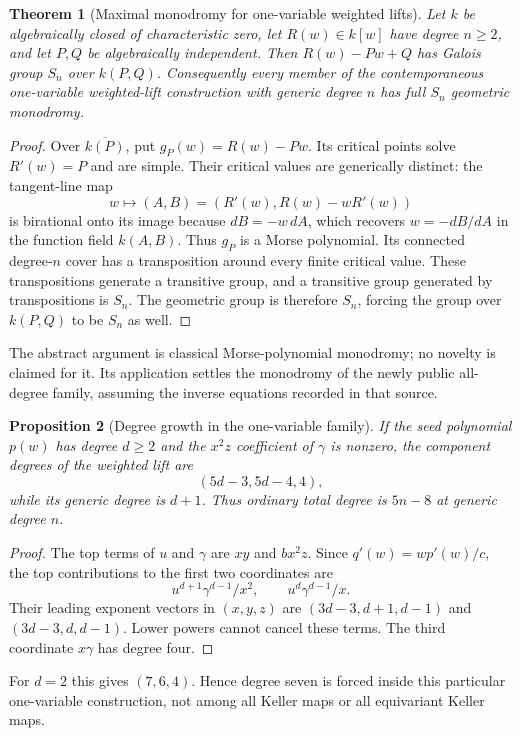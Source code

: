\documentclass[11pt]{article}
\newtheorem{theorem}{Theorem}[section]
\newtheorem{proposition}[theorem]{Proposition}
\theoremstyle{remark}
\begin{document}
\begin{theorem}[Maximal monodromy for one-variable weighted lifts]
Let $k$ be algebraically closed of characteristic zero, let
$R(w)\in k[w]$ have degree $n\ge2$, and let $P,Q$ be algebraically
independent. Then $R(w)-Pw+Q$ has Galois group $S_n$ over $k(P,Q)$.
Consequently every member of the contemporaneous one-variable weighted-lift
construction with generic degree $n$ has full $S_n$ geometric monodromy.
\end{theorem}
\begin{proof}
Over $\overline{k(P)}$, put $g_P(w)=R(w)-Pw$. Its critical points solve
$R'(w)=P$ and are simple. Their critical values are generically distinct:
the tangent-line map
\[
w\longmapsto(A,B)=(R'(w),R(w)-wR'(w))
\]
is birational onto its image because $dB=-w\,dA$, which recovers
$w=-dB/dA$ in the function field $k(A,B)$. Thus $g_P$ is a Morse
polynomial. Its connected degree-$n$ cover has a transposition around every
finite critical value. These transpositions generate a transitive group, and
a transitive group generated by transpositions is $S_n$. The geometric group
is therefore $S_n$, forcing the group over $k(P,Q)$ to be $S_n$ as well.
\end{proof}

The abstract argument is classical Morse-polynomial monodromy; no novelty is
claimed for it. Its application settles the monodromy of the newly public
all-degree family, assuming the inverse equations recorded in that source.

\begin{proposition}[Degree growth in the one-variable family]
If the seed polynomial $p(w)$ has degree $d\ge2$ and the $x^2z$ coefficient
of $\gamma$ is nonzero, the component degrees of the weighted lift are
\[
(5d-3,5d-4,4),
\]
while its generic degree is $d+1$. Thus ordinary total degree is $5n-8$ at
generic degree $n$.
\end{proposition}
\begin{proof}
The top terms of $u$ and $\gamma$ are $xy$ and $bx^2z$. Since
$q'(w)=wp'(w)/c$, the top contributions to the first two coordinates are
\[
u^{d+1}\gamma^{d-1}/x^2,
\qquad u^d\gamma^{d-1}/x.
\]
Their leading exponent vectors in $(x,y,z)$ are
$(3d-3,d+1,d-1)$ and $(3d-3,d,d-1)$. Lower powers cannot cancel these
terms. The third coordinate $x\gamma$ has degree four.
\end{proof}

For $d=2$ this gives $(7,6,4)$. Hence degree seven is forced inside this
particular one-variable construction, not among all Keller maps or all
equivariant Keller maps.
\end{document}
